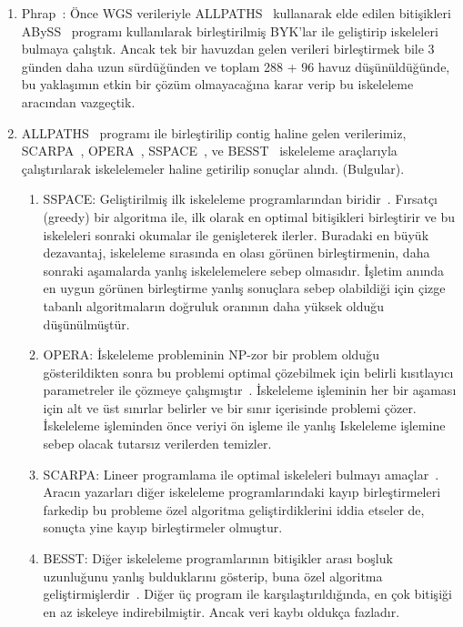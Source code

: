 \documentclass[11pt]{article}
\begin{document}
\begin{enumerate}

\item Phrap~\cite{phrap}: Önce WGS verileriyle ALLPATHS~\cite{Gnerre2011} kullanarak elde edilen bitişikleri ABySS~\cite{Simpson2009} programı kullanılarak birleştirilmiş BYK'lar ile geliştirip iskeleleri bulmaya çalıştık. Ancak tek bir havuzdan gelen verileri birleştirmek bile  3 günden daha uzun sürdüğünden ve toplam 288 + 96 havuz düşünüldüğünde, bu yaklaşımın etkin bir çözüm olmayacağına karar verip bu iskeleleme aracından vazgeçtik.
  
\item ALLPATHS~\cite{Gnerre2011} programı ile birleştirilip contig haline gelen verilerimiz, SCARPA~\cite{Donmez2013}, OPERA~\cite{Gao2011}, SSPACE~\cite{Boetzer2011}, ve BESST~\cite{Sahlin2014} iskeleleme araçlarıyla çalıştırılarak iskelelemeler haline getirilip sonuçlar alındı. (Bulgular). 
  
  \begin{enumerate}
    \item
      SSPACE: Geliştirilmiş ilk iskeleleme programlarından biridir~\cite{Boetzer2011}. Fırsatçı (greedy) bir algoritma ile, ilk olarak en optimal bitişikleri birleştirir ve bu iskeleleri sonraki okumalar ile genişleterek ilerler. Buradaki en büyük dezavantaj, iskeleleme sırasında en olası görünen birleştirmenin, daha sonraki aşamalarda yanlış iskelelemelere sebep olmasıdır. İşletim anında en uygun görünen birleştirme yanlış sonuçlara sebep olabildiği için çizge tabanlı algoritmaların doğruluk oranının daha yüksek olduğu düşünülmüştür. 

    \item OPERA: İskeleleme probleminin NP-zor bir problem olduğu gösterildikten sonra bu problemi optimal çözebilmek için belirli  kısıtlayıcı parametreler ile çözmeye çalışmıştır~\cite{Gao2011}. İskeleleme işleminin her bir aşaması için alt ve üst sınırlar belirler ve bir sınır içerisinde problemi çözer. İskeleleme işleminden önce veriyi ön işleme ile yanlış Iskeleleme işlemine sebep olacak  tutarsız verilerden temizler.
      
    \item SCARPA: Lineer programlama ile optimal iskeleleri bulmayı amaçlar~\cite{Donmez2013}. Aracın yazarları diğer iskeleleme programlarındaki kayıp birleştirmeleri farkedip bu probleme özel algoritma geliştirdiklerini iddia etseler de, sonuçta yine kayıp birleştirmeler olmuştur.
      
\item BESST: Diğer iskeleleme programlarının bitişikler arası boşluk uzunluğunu yanlış bulduklarını gösterip, buna özel algoritma geliştirmişlerdir~\cite{Sahlin2014}. Diğer üç program ile karşılaştırıldığında, en çok bitişiği en az iskeleye indirebilmiştir. Ancak veri kaybı oldukça fazladır.
  \end{enumerate}

\end{enumerate}
\end{document}
